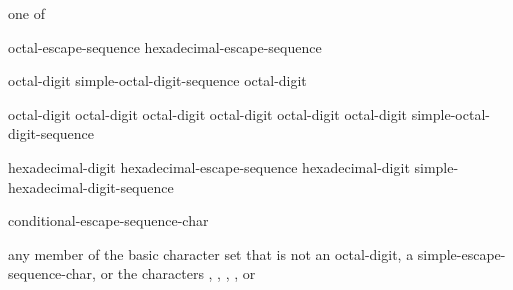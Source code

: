 \documentclass{wg21}
\begin{document}
\begin{bnf}
     \textnormal{one of}\br
\end{bnf}

\begin{bnf}
    \br
    octal-escape-sequence\br
    hexadecimal-escape-sequence
\end{bnf}

\begin{bnf}
    \br
    octal-digit\br
    simple-octal-digit-sequence octal-digit
\end{bnf}

\begin{bnf}
    \br
    \terminal{\textbackslash} octal-digit\br
    \terminal{\textbackslash} octal-digit octal-digit\br
    \terminal{\textbackslash} octal-digit octal-digit octal-digit\br
     simple-octal-digit-sequence \terminal{\}}\br
\end{bnf}

\begin{bnf}
    \br
     hexadecimal-digit\br
    hexadecimal-escape-sequence hexadecimal-digit\br
     simple-hexadecimal-digit-sequence \terminal{\}}
\end{bnf}

\begin{bnf}
    \br
    \terminal{\textbackslash} conditional-escape-sequence-char
\end{bnf}

\begin{bnf}
    \br
    \textnormal{any member of the basic character set that is not an} octal-digit\textnormal{, a} simple-escape-sequence-char\textnormal{, or the characters , , , , or }
\end{bnf}
\end{document}

